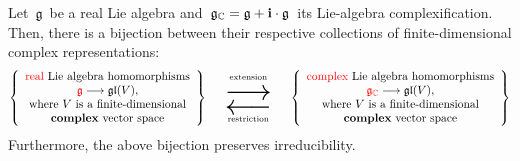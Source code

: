 \vskip 0.5cm
\begin{corollary}
\label{ComplexIrrrepsOfARealLieAlgebraAreTheSameAsTheRealOnes}
\mbox{}
\vskip 0.05cm
\noindent
Let \,$\mathfrak{g}$\, be a real Lie algebra and
\,$\mathfrak{g}_{\mathbb{C}} = \mathfrak{g} + \textnormal{\bf i}\cdot\mathfrak{g}$\,
its Lie-algebra complexification.
Then, there is a bijection between their respective collections of finite-dimensional complex representations:
\begin{equation*}
\left\{\begin{array}{c}
	\textnormal{{\color{red}real} Lie algebra homomorphisms}
	\\
	{\color{red}\mathfrak{g}} \longrightarrow \gl(V),
	\\
	\textnormal{where $V$ is a finite-dimensional}
	\\
	\textnormal{\textbf{complex} vector space}
	\end{array}\right\}
\quad
\begin{array}{c}
\overset{\underset{{\color{white}.}}{\textnormal{extension}}}{\textnormal{\Huge$\longrightarrow$}}
\\
\underset{{\textnormal{restriction}}}{\textnormal{\Huge$\longleftarrow$}}
\end{array}
\quad
\left\{\begin{array}{c}
	\textnormal{{\color{red}complex} Lie algebra homomorphisms}
	\\
	{\color{red}\mathfrak{g}_{\C}} \longrightarrow \gl(V),
	\\
	\textnormal{where $V$ is a finite-dimensional}
	\\
	\textnormal{\textbf{complex} vector space}
	\end{array}\right\}
\end{equation*}
Furthermore, the above bijection preserves irreducibility.
\end{corollary}


